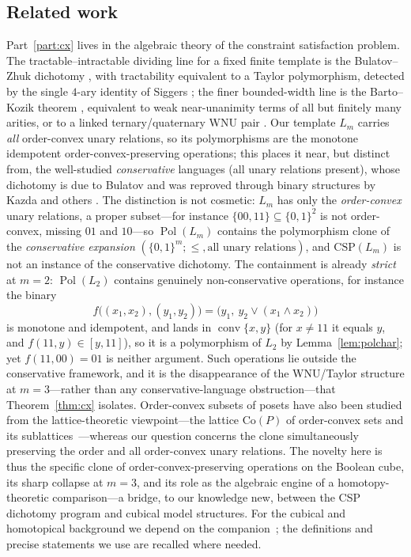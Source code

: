 \documentclass[11pt]{amsart}
\theoremstyle{plain}
\theoremstyle{definition}
\DeclareMathOperator{\conv}{conv}
\DeclareMathOperator{\Pol}{Pol}
\newcommand{\B}{\{0,1\}}
\begin{document}
\subsection*{Related work}
Part~\ref{part:cx} lives in the algebraic theory of the constraint
satisfaction problem.  The tractable--intractable dividing line for a
fixed finite template is the Bulatov--Zhuk dichotomy \cite{Bulatov,Zhuk},
with tractability equivalent to a Taylor polymorphism, detected by the
single $4$-ary identity of Siggers \cite{Siggers,KMM}; the finer
bounded-width line is the Barto--Kozik theorem \cite{BartoKozik},
equivalent to weak near-unanimity terms of all but finitely many arities,
or to a linked ternary/quaternary WNU pair \cite{KKVW}.  Our
template $L_m$ carries \emph{all} order-convex unary relations, so its
polymorphisms are the monotone idempotent order-convex-preserving
operations; this places it near, but distinct from, the well-studied
\emph{conservative} languages (all unary relations present), whose
dichotomy is due to Bulatov and was reproved through binary structures by
Kazda and others \cite{BulatovCons,Kazda}.  The distinction is not
cosmetic: $L_m$ has only the \emph{order-convex} unary relations, a proper
subset---for instance $\{00,11\}\subseteq\B^2$ is not order-convex,
missing $01$ and $10$---so $\Pol(L_m)$ contains the polymorphism clone of
the \emph{conservative expansion} $(\B^m;\le,\text{all unary relations})$,
and $\mathrm{CSP}(L_m)$ is not an instance of the conservative dichotomy.
The containment is already \emph{strict} at $m=2$: $\Pol(L_2)$ contains
genuinely non-conservative operations, for instance the binary
\[
  f\bigl((x_1,x_2),(y_1,y_2)\bigr)=\bigl(y_1,\ y_2\vee(x_1\wedge x_2)\bigr)
\]
is monotone and idempotent, and lands in $\conv\{x,y\}$ (for $x\ne11$ it
equals $y$, and $f(11,y)\in[y,11]$), so it is a polymorphism of $L_2$ by
Lemma~\ref{lem:polchar}; yet $f(11,00)=01$ is neither argument.  Such
operations lie outside the conservative framework, and it is the
disappearance of the WNU/Taylor structure at $m=3$---rather than any
conservative-language obstruction---that Theorem~\ref{thm:cx} isolates.
Order-convex subsets of posets have also been studied from the
lattice-theoretic viewpoint---the lattice $\mathrm{Co}(P)$ of order-convex
sets and its sublattices~\cite{SemenovaWehrung}---whereas our question
concerns the clone simultaneously preserving the order and all order-convex
unary relations.
The novelty here is thus the specific
clone of order-convex-preserving operations on the Boolean cube, its sharp
collapse at $m=3$, and its role as the algebraic engine of a
homotopy-theoretic comparison---a bridge, to our knowledge new, between
the CSP dichotomy program and cubical model structures.  For the cubical
and homotopical background we depend on the companion~\cite{PaperW}; the
definitions and precise statements we use are recalled where needed.
\end{document}

